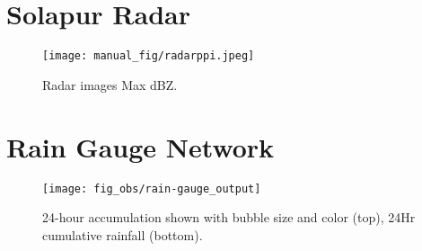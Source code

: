 \documentclass[12pt,a4paper]{article} %
\begin{document}
\section{Solapur Radar}
\begin{figure}[H]
\centering
\texttt{[image: manual\_fig/radarppi.jpeg]}
\caption{Radar images Max dBZ.}
\end{figure}



\section{Rain Gauge Network}
\begin{figure}[H]
\centering
\texttt{[image: fig\_obs/rain-gauge\_output]}
\caption{24-hour accumulation shown with bubble size and color (top), 24Hr cumulative rainfall (bottom).}

\end{figure}








\end{document}
